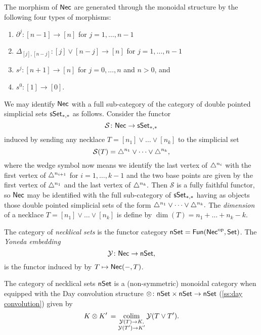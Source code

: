 The morphism of $\mathsf{Nec}$ are generated through the monoidal structure by the following four types of morphisms:
\begin{enumerate}
	\item $\partial^j \colon [n-1] \to [n]$ for $j = 1, \dots, n-1$
	\item $\Delta_{[j], [n-j]} \colon  [j] \vee [n-j] \to [n]$ for $j = 1, \dots, n-1$
	\item $s^j \colon [n+1] \to [n]$ for $j = 0, \dots, n$ and $n>0$, and 
	\item $s^0 \colon [1] \to [0]$.
\end{enumerate}
We may identify $\mathsf{Nec}$ with a full sub-category of the category of double pointed simplicial sets $\mathsf{sSet}_{*,*}$ as follows.
Consider the functor
\begin{equation*}
\mathcal{S} \colon \mathsf{Nec} \to \mathsf{sSet}_{*,*}
\end{equation*}
 induced by sending any necklace $T = [n_1] \vee \dots \vee[n_k]$ to the simplicial set
\begin{equation*}
\mathcal{S}(T)= \triangle^{n_1} \vee\dots \vee \triangle^{n_k},
\end{equation*}
where the wedge symbol now means we identify the last vertex of $\triangle^{n_i}$ with the first vertex of $\triangle^{n_{i+1}}$ for $i = 1, \dots, k-1$ and the two base points are given by the first vertex of $\triangle^{n_1}$ and the last vertex of $\triangle^{n_k}.$
Then $\mathcal{S}$ is a fully faithful functor, so $\mathsf{Nec}$ may be identified with the full sub-category of $\mathsf{sSet}_{*,*}$ having as objects those double pointed simplicial sets of the form $\triangle^{n_1} \vee \dots \vee \triangle^{n_k}.$
The \textit{dimension} of a necklace $T = [n_1] \vee \dots \vee[n_k]$ is define by $\dim(T) = n_1 + \dots + n_k-k$.

The category of \textit{necklical sets} is the functor category $\mathsf{nSet} = \mathsf{Fun}(\mathsf{Nec}^{\mathrm{op}}, \mathsf{Set})$.
The \textit{Yoneda embedding}
\[
\mathcal{Y} \colon \mathsf{Nec} \to \mathsf{nSet},
\]
is the functor induced by by $T \mapsto \mathsf{Nec}(-,T)$.

The category of necklical sets $\mathsf{nSet}$ is a (non-symmetric) monoidal category when equipped with the Day convolution structure $\otimes \colon \mathsf{nSet} \times \mathsf{nSet} \to \mathsf{nSet}$ (\cref{ss:day convolution}) given by
\begin{equation*}
K \otimes K' \, = \operatorname*{colim}_{\substack{\mathcal{Y}(T) \to K, \\ \mathcal{Y}(T')\to K'}} \mathcal{Y}(T \vee T').
\end{equation*}

